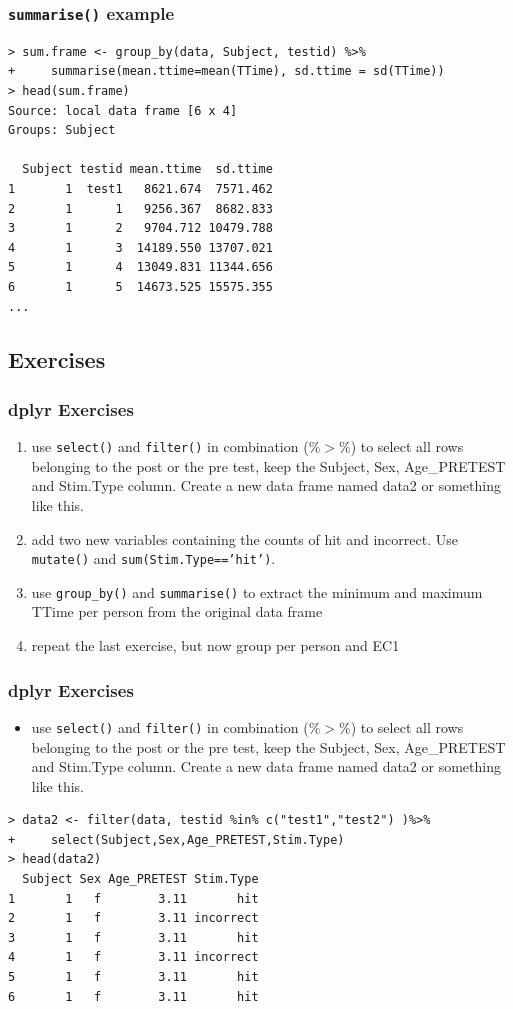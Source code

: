 \documentclass[xcolor={table},c]{beamer}
\begin{document}
\begin{frame}[fragile]\frametitle{\texttt{summarise()} example}
\footnotesize
\begin{verbatim}
> sum.frame <- group_by(data, Subject, testid) %>%
+     summarise(mean.ttime=mean(TTime), sd.ttime = sd(TTime))
> head(sum.frame)
Source: local data frame [6 x 4]
Groups: Subject

  Subject testid mean.ttime  sd.ttime
1       1  test1   8621.674  7571.462
2       1      1   9256.367  8682.833
3       1      2   9704.712 10479.788
4       1      3  14189.550 13707.021
5       1      4  13049.831 11344.656
6       1      5  14673.525 15575.355
...
\end{verbatim}
\end{frame}

\subsection{Exercises}
\begin{frame}[fragile]\frametitle{dplyr Exercises}
  \begin{enumerate}
  \item use \texttt{select()} and \texttt{filter()} in combination ($\%>\%$) to select all rows belonging to the post or the pre test, keep the Subject, Sex, Age\_PRETEST and Stim.Type column. Create a new data frame named data2 or something like this.
  \item add two new variables containing the counts of hit and incorrect. Use \texttt{mutate()} and \texttt{sum(Stim.Type=='hit')}.
  \item use \texttt{group\_by()} and \texttt{summarise()} to extract the minimum and maximum TTime per person from the original data frame
  \item repeat the last exercise, but now group per person and EC1
  \end{enumerate}
\end{frame}


\begin{frame}[fragile]\frametitle{dplyr Exercises}
  \begin{itemize}
  \item use \texttt{select()} and \texttt{filter()} in combination ($\%>\%$) to select all rows belonging to the post or the pre test, keep the Subject, Sex, Age\_PRETEST and Stim.Type column. Create a new data frame named data2 or something like this.
  \end{itemize}
\begin{verbatim}
> data2 <- filter(data, testid %in% c("test1","test2") )%>%
+     select(Subject,Sex,Age_PRETEST,Stim.Type)
> head(data2)
  Subject Sex Age_PRETEST Stim.Type
1       1   f        3.11       hit
2       1   f        3.11 incorrect
3       1   f        3.11       hit
4       1   f        3.11 incorrect
5       1   f        3.11       hit
6       1   f        3.11       hit
\end{verbatim}
\end{frame}
\end{document}
